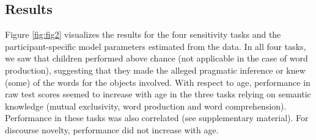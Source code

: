 \documentclass[
  man,floatsintext]{apa6}
\begin{document}
\hypertarget{results}{%
\subsection{Results}\label{results}}

Figure \ref{fig:fig2} visualizes the results for the four sensitivity tasks and the participant-specific model parameters estimated from the data. In all four tasks, we saw that children performed above chance (not applicable in the case of word production), suggesting that they made the alleged pragmatic inference or knew (some) of the words for the objects involved. With respect to age, performance in raw test scores seemed to increase with age in the three tasks relying on semantic knowledge (mutual exclusivity, word production and word comprehension). Performance in these tasks was also correlated (see supplementary material). For discourse novelty, performance did not increase with age.
\end{document}
